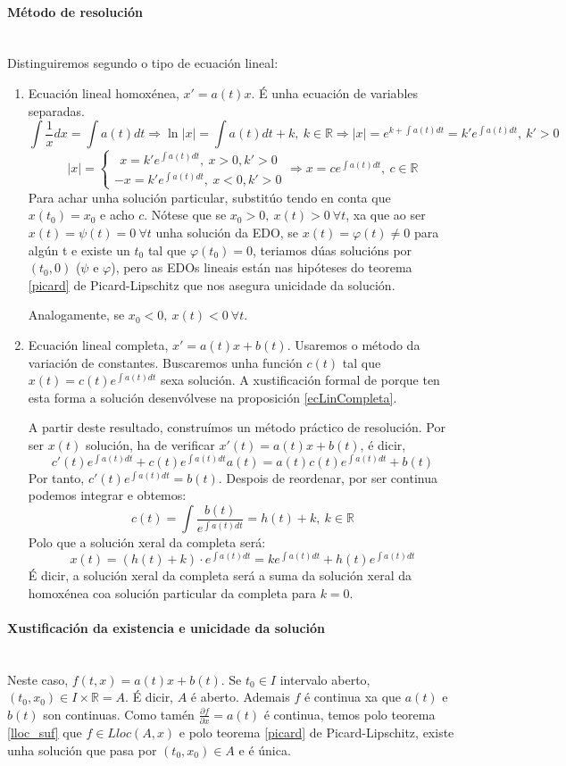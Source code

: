 \documentclass[11pt, a4paper,twoside]{article}
\theoremstyle{theorem-style}  %
\theoremstyle{definition-style}
\theoremstyle{example-style}
\providecommand{\abs}[1]{\left\lvert#1\right\rvert} %
\begin{document}
\paragraph{Método de resolución} \ \\
Distinguiremos segundo o tipo de ecuación lineal:
\begin{enumerate}[\quad i)]
	\item Ecuación lineal homoxénea, $ x'=a(t)x $. É unha ecuación de variables separadas.
	\[ \int\frac{1}{x}dx=\int a(t)dt\Rightarrow\ln\abs{x}=\int a(t)dt+k, \ k\in\mathbb{R}\Rightarrow\abs{x}=e^{k+\int a(t)dt}=k'e^{\int a(t)dt}, \ k'>0 \]
	\[ \abs{x}=\begin{cases}
	\ \ x=k'e^{\int a(t)dt}, \ x>0, k'>0\\
	-x=k'e^{\int a(t)dt}, \ x<0, k'>0
	\end{cases}\Rightarrow x=ce^{\int a(t)dt}, \ c\in \mathbb{R}  \]
	Para achar unha solución particular, substitúo tendo en conta que $ x(t_0)=x_0 $ e acho $ c $. Nótese que se $ x_0>0,\ x(t)>0\ \forall t $, xa que ao ser $ x(t)= \psi(t)=0 \ \forall t$ unha solución da EDO, se $ x(t)= \varphi(t)\neq0 $ para algún t e existe un $ t_0 $ tal que $ \varphi(t_0)=0 $, teriamos dúas solucións por $ (t_0,0) $ ($ \psi $ e $ \varphi $), pero as EDOs lineais están nas hipóteses do teorema \ref{picard} de Picard-Lipschitz que nos asegura unicidade da solución.
	
	Analogamente, se $ x_0<0,\ x(t)<0\ \forall t $.
	\item Ecuación lineal completa, $ x'=a(t)x +b(t) $. Usaremos o método da variación de constantes. Buscaremos unha función $ c(t) $ tal que $ x(t)=c(t)e^{\int a(t) dt} $ sexa solución. A xustificación formal de porque ten esta forma a solución desenvólvese na proposición \ref{ecLinCompleta}.
	
	A partir deste resultado, construímos un método práctico de resolución. Por ser $ x(t) $ solución, ha de verificar $ x'(t)=a(t)x+b(t) $, é dicir,
	\[ c'(t)e^{\int a(t)dt}+c(t)e^{\int a(t)dt}a(t)=a(t)c(t)e^{\int a(t)dt}+b(t) \]
	Por tanto, $ c'(t)e^{\int a(t)dt}=b(t) $. Despois de reordenar, por ser continua podemos integrar e obtemos:
	\[ c(t)=\int \frac{b(t)}{e^{\int a(t)dt}}=h(t)+k, \ k\in \mathbb{R} \]
	Polo que a solución xeral da completa será:
	\[ x(t)=(h(t)+k)\cdot e^{\int a(t)dt}=ke^{\int a(t)dt}+h(t)e^{\int a(t)dt} \]
	É dicir, a solución xeral da completa será a suma da solución xeral da homoxénea coa solución particular da completa para $ k=0 $.
\end{enumerate}
\paragraph{Xustificación da existencia e unicidade da solución}\ \\
Neste caso, $ f(t,x)=a(t)x+b(t) $. Se $ t_0\in I $ intervalo aberto, $ (t_0, x_0)\in I\times \mathbb{R}=A $. É dicir, $ A $ é aberto. Ademais $ f $ é continua xa que $ a(t) $ e $ b(t) $ son continuas. Como tamén $ \frac{\partial f}{\partial x}=a(t) $ é continua, temos polo teorema \ref{lloc_suf} que $ f\in L{loc}(A,x) $ e polo teorema \ref{picard} de Picard-Lipschitz, existe unha solución que pasa por $ (t_0, x_0)\in A$ e é única.
\end{document}
